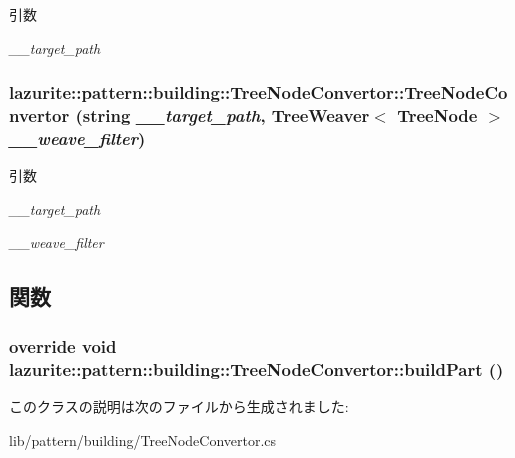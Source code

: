 \begin{DoxyParams}{引数}
\item[{\em \_\-\_\-target\_\-path}]\end{DoxyParams}
\hypertarget{classlazurite_1_1pattern_1_1building_1_1_tree_node_convertor_a737583ada628dc670ba4eb789b8a556a}{
\subsubsection[{TreeNodeConvertor}]{\setlength{\rightskip}{0pt plus 5cm}lazurite::pattern::building::TreeNodeConvertor::TreeNodeConvertor (string {\em \_\-\_\-target\_\-path}, \/  TreeWeaver$<$ TreeNode $>$ {\em \_\-\_\-weave\_\-filter})}}
\label{classlazurite_1_1pattern_1_1building_1_1_tree_node_convertor_a737583ada628dc670ba4eb789b8a556a}

\begin{DoxyParams}{引数}
\item[{\em \_\-\_\-target\_\-path}]\item[{\em \_\-\_\-weave\_\-filter}]\end{DoxyParams}


\subsection{関数}
\hypertarget{classlazurite_1_1pattern_1_1building_1_1_tree_node_convertor_adf8062163b4f8dda539382373fe8cff2}{
\subsubsection[{buildPart}]{\setlength{\rightskip}{0pt plus 5cm}override void lazurite::pattern::building::TreeNodeConvertor::buildPart ()}}
\label{classlazurite_1_1pattern_1_1building_1_1_tree_node_convertor_adf8062163b4f8dda539382373fe8cff2}


このクラスの説明は次のファイルから生成されました:\begin{DoxyCompactItemize}
\item 
lib/pattern/building/TreeNodeConvertor.cs\end{DoxyCompactItemize}
